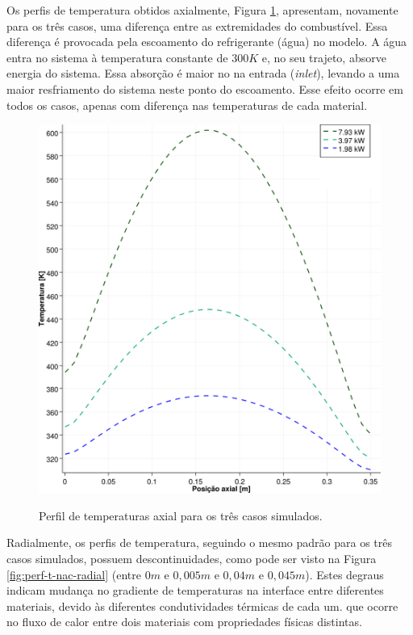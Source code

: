 Os perfis de temperatura obtidos axialmente, Figura \ref{fig:perf-t-nac-axial},
apresentam, novamente para os três casos, uma diferença entre as extremidades
do combustível. Essa diferença é provocada pela escoamento do refrigerante (água) no
modelo. A água entra no sistema à temperatura constante de $300 K$ e, no seu trajeto,
absorve energia do sistema. Essa absorção é maior no na entrada (\textit{inlet}),
levando a uma maior resfriamento do sistema neste ponto do escoamento. Esse efeito
ocorre em todos os casos, apenas com diferença nas temperaturas de cada material.

\begin{figure}[htb]
  \caption{Perfil de temperaturas axial para os três casos simulados.}
  \centering\includegraphics[scale=0.6]{figuras/T_z_NC_square_port.png}
  \label{fig:perf-t-nac-axial}
\end{figure}

Radialmente, os perfis de temperatura, seguindo o mesmo padrão para os três casos simulados,
possuem descontinuidades, como pode ser visto na Figura \ref{fig:perf-t-nac-radial} (entre
$0 m$ e $0,005 m$ e $0,04 m$ e $0,045 m$). Estes degraus indicam mudança no gradiente de temperaturas na
interface entre diferentes materiais, devido às diferentes condutividades térmicas de cada um.
que ocorre no fluxo de calor entre dois materiais com propriedades físicas distintas.

